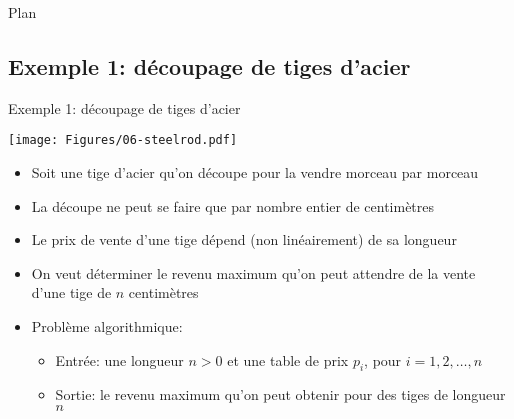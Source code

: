 \begin{frame}{Plan}


\end{frame}

\subsection{Exemple 1: découpage de tiges d'acier}

\begin{frame}{Exemple 1: découpage de tiges d'acier}

\bigskip

\centerline{\texttt{[image: Figures/06-steelrod.pdf]}}

\bigskip

\begin{itemize}
\item Soit une tige d'acier qu'on découpe pour la vendre morceau par morceau
\item La découpe ne peut se faire que par nombre entier de centimètres
\item Le prix de vente d'une tige dépend (non linéairement) de sa longueur
\item On veut déterminer le revenu maximum qu'on peut attendre de la
  vente d'une tige de $n$ centimètres
\item Problème algorithmique:
\begin{itemize}
\item Entrée: une longueur $n>0$ et une table de prix $p_i$, pour $i=1,2,\ldots,n$
\item Sortie: le revenu maximum qu'on peut obtenir pour des tiges de longueur $n$
\end{itemize}
\end{itemize}
\end{frame}

